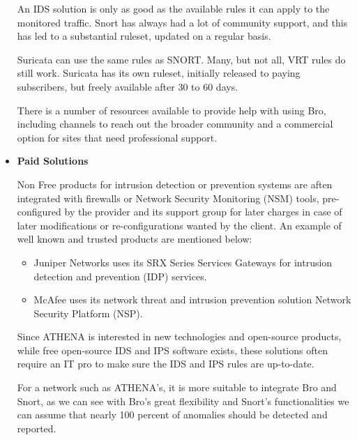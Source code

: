 \begin{itemize}[label=]
An IDS solution is only as good as the available rules it can apply to the monitored traffic. Snort has always had a lot of community support, and this has led to a substantial ruleset, updated on a regular basis. 

Suricata can use the same rules as SNORT. Many, but not all, VRT rules do still work. Suricata has its own ruleset, initially released to paying subscribers, but freely available after 30 to 60 days.

There is a number of resources available to provide help with using Bro, including channels to reach out the broader community and a commercial option for sites that need professional support.
\item\textbf{Paid Solutions}

Non Free products for intrusion detection or prevention systems are aften integrated with firewalls or Network Security Monitoring (NSM) tools, pre-configured by the provider and its support group for later charges in case of later modifications or re-configurations wanted by the client. An example of well known and trusted products are mentioned below:
\begin{itemize}
    \item Juniper Networks uses its SRX Series Services Gateways for intrusion detection and prevention (IDP) services. 

    \item McAfee uses its network threat and intrusion prevention solution Network Security Platform (NSP).
\end{itemize}

Since ATHENA is interested in new technologies and open-source products, while free open-source IDS and IPS software exists, these solutions often require an IT pro to make sure the IDS and IPS rules are up-to-date.

For a network such as ATHENA’s, it is more suitable to integrate Bro and Snort, as we can see with Bro’s great flexibility and Snort’s functionalities we can assume that nearly 100 percent of anomalies should be detected and reported.

\end{itemize}
